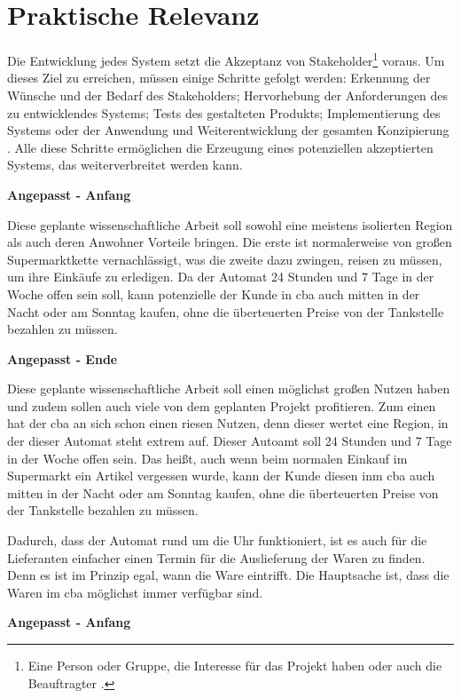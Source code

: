 \section{Praktische Relevanz}

Die Entwicklung jedes System setzt die Akzeptanz von Stakeholder\footnote{Eine Person oder Gruppe, die Interesse für das Projekt 
haben oder auch die Beauftragter \cite{refip:HSSI}.} voraus. Um dieses Ziel zu erreichen, müssen einige Schritte gefolgt
werden: Erkennung der Wünsche und der Bedarf des Stakeholders; Hervorhebung der Anforderungen des zu entwicklendes Systems;
Tests des gestalteten Produkts; Implementierung des Systems oder der Anwendung und Weiterentwicklung der
gesamten Konzipierung \cite{refbook:RECR}. Alle diese Schritte ermöglichen die Erzeugung eines potenziellen akzeptierten 
Systems, das weiterverbreitet werden kann.

\textbf{Angepasst - Anfang}

Diese geplante wissenschaftliche Arbeit soll sowohl eine meistens isolierten Region als auch deren Anwohner Vorteile bringen.
Die erste ist normalerweise von großen Supermarktkette vernachlässigt, was die zweite dazu zwingen, reisen zu müssen, um ihre
Einkäufe zu erledigen. Da der Automat 24 Stunden und 7 Tage in der Woche offen sein soll, kann potenzielle der Kunde in \acrfull{cba}
auch mitten in der Nacht oder am Sonntag kaufen, ohne die überteuerten Preise von der Tankstelle bezahlen zu müssen. 

\textbf{Angepasst - Ende}

Diese geplante wissenschaftliche Arbeit soll einen möglichst großen Nutzen haben und zudem sollen auch viele von dem geplanten 
Projekt profitieren. Zum einen hat der \acrfull{cba} an sich schon einen riesen Nutzen, denn dieser wertet eine Region, in der
dieser Automat steht extrem auf. Dieser Autoamt soll 24 Stunden und 7 Tage in der Woche offen sein. Das heißt, auch wenn beim
normalen Einkauf im Supermarkt ein Artikel vergessen wurde, kann der Kunde diesen inm \acrfull{cba} auch mitten in der Nacht 
oder am Sonntag kaufen, ohne die überteuerten Preise von der Tankstelle bezahlen zu müssen. 

Dadurch, dass der Automat rund um die Uhr funktioniert, ist es auch für die Lieferanten einfacher einen Termin für die Auslieferung 
der Waren zu finden. Denn es ist im Prinzip egal, wann die Ware eintrifft. Die Hauptsache ist, dass die Waren im \acrfull{cba}
möglichst immer verfügbar sind. 

\textbf{Angepasst - Anfang}


